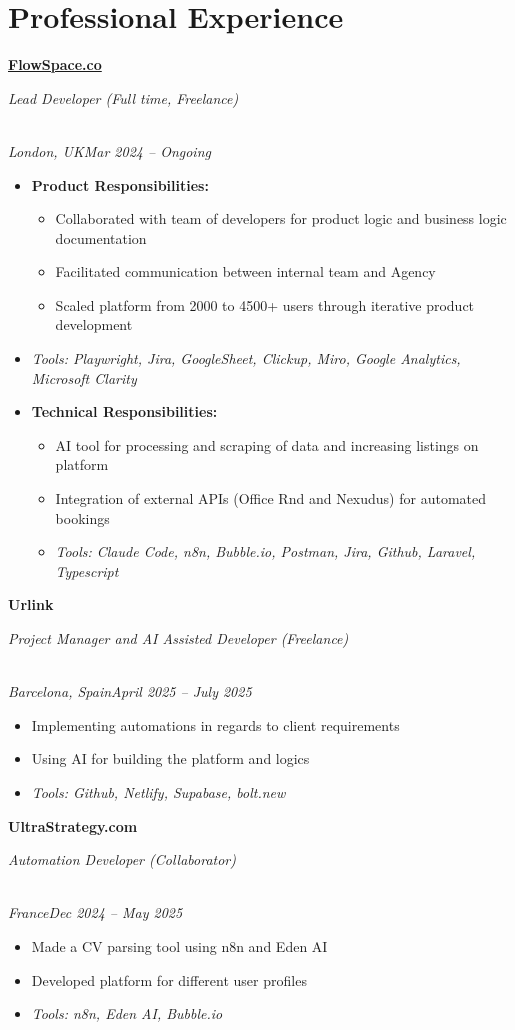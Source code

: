 \documentclass[a4paper,10pt]{article}
\newcommand{\role}[4]{\vspace{3pt}\noindent\hspace{0.6em}\parbox[t]{0.38\textwidth}{\raggedright\textbf{#1}}\hfill\parbox[t]{0.58\textwidth}{\raggedleft\textit{#2}}\\{\textit{#3}\hfill\textit{#4}}\vspace{1pt}}
\begin{document}
\section{Professional Experience}
\role{\href{https://flowspace.co}{FlowSpace.co}}{Lead Developer (Full time, Freelance)}{London, UK}{Mar 2024 -- Ongoing}
\begin{itemize}
\item \textbf{Product Responsibilities:}
\begin{itemize}[label=--]
\item Collaborated with team of developers for product logic and business logic documentation
\item Facilitated communication between internal team and Agency
\item Scaled platform from 2000 to 4500+ users through iterative product development
\end{itemize}
\item \textit{Tools: Playwright, Jira, GoogleSheet, Clickup, Miro, Google Analytics, Microsoft Clarity}
\item \textbf{Technical Responsibilities:}
\begin{itemize}[label=--]
\item AI tool for processing and scraping of data and increasing listings on platform
\item Integration of external APIs (Office Rnd and Nexudus) for automated bookings
\item \textit{Tools: Claude Code, n8n, Bubble.io, Postman, Jira, Github, Laravel, Typescript}
\end{itemize}
\end{itemize}

\role{Urlink}{Project Manager and AI Assisted Developer (Freelance)}{Barcelona, Spain}{April 2025 -- July 2025}
\begin{itemize}
\item Implementing automations in regards to client requirements
\item Using AI for building the platform and logics
\item \textit{Tools: Github, Netlify, Supabase, bolt.new}
\end{itemize}

\role{UltraStrategy.com}{Automation Developer (Collaborator)}{France}{Dec 2024 -- May 2025}
\begin{itemize}
\item Made a CV parsing tool using n8n and Eden AI
\item Developed platform for different user profiles
\item \textit{Tools: n8n, Eden AI, Bubble.io}
\end{itemize}
\end{document}
